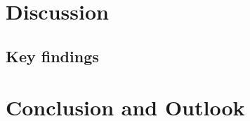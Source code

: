 \chapter{Discussion}
\label{sec:discussion}

\section{Key findings}

\chapter{Conclusion and Outlook}
